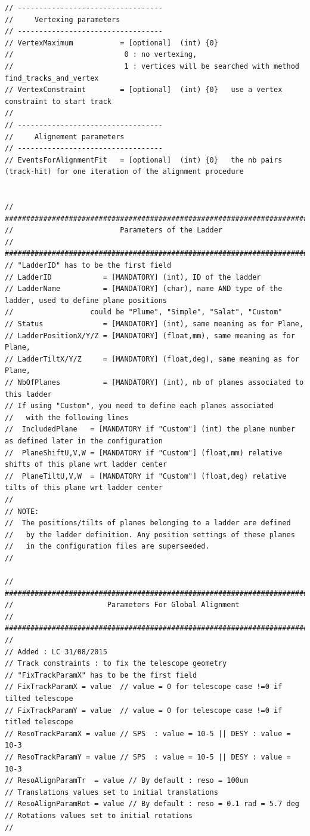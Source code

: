 \documentclass[a4paper, 12pt, twoside]{article}
\begin{document}
\begin{verbatim}
// ----------------------------------
//     Vertexing parameters
// ----------------------------------
// VertexMaximum           = [optional]  (int) {0}
//                          0 : no vertexing,
//                          1 : vertices will be searched with method find_tracks_and_vertex
// VertexConstraint        = [optional]  (int) {0}   use a vertex constraint to start track
//
// ----------------------------------
//     Alignement parameters
// ----------------------------------
// EventsForAlignmentFit   = [optional]  (int) {0}   the nb pairs (track-hit) for one iteration of the alignment procedure


// #############################################################################
//                         Parameters of the Ladder
// #############################################################################
// "LadderID" has to be the first field
// LadderID            = [MANDATORY] (int), ID of the ladder
// LadderName          = [MANDATORY] (char), name AND type of the ladder, used to define plane positions
//                  could be "Plume", "Simple", "Salat", "Custom"
// Status              = [MANDATORY] (int), same meaning as for Plane,
// LadderPositionX/Y/Z = [MANDATORY] (float,mm), same meaning as for Plane,
// LadderTiltX/Y/Z     = [MANDATORY] (float,deg), same meaning as for Plane,
// NbOfPlanes          = [MANDATORY] (int), nb of planes associated to this ladder
// If using "Custom", you need to define each planes associated
//   with the following lines
//  IncludedPlane   = [MANDATORY if "Custom"] (int) the plane number as defined later in the configuration
//  PlaneShiftU,V,W = [MANDATORY if "Custom"] (float,mm) relative shifts of this plane wrt ladder center
//  PlaneTiltU,V,W  = [MANDATORY if "Custom"] (float,deg) relative tilts of this plane wrt ladder center
//
// NOTE:
//  The positions/tilts of planes belonging to a ladder are defined
//   by the ladder definition. Any position settings of these planes
//   in the configuration files are superseeded.
//

// #############################################################################
//                      Parameters For Global Alignment
// #############################################################################
//
// Added : LC 31/08/2015
// Track constraints : to fix the telescope geometry
// "FixTrackParamX" has to be the first field
// FixTrackParamX = value  // value = 0 for telescope case !=0 if tilted telescope
// FixTrackParamY = value  // value = 0 for telescope case !=0 if titled telescope
// ResoTrackParamX = value // SPS  : value = 10-5 || DESY : value = 10-3
// ResoTrackParamY = value // SPS  : value = 10-5 || DESY : value = 10-3
// ResoAlignParamTr  = value // By default : reso = 100um                // Translations values set to initial translations
// ResoAlignParamRot = value // By default : reso = 0.1 rad = 5.7 deg    // Rotations values set to initial rotations
//


\end{verbatim}
\end{document}
